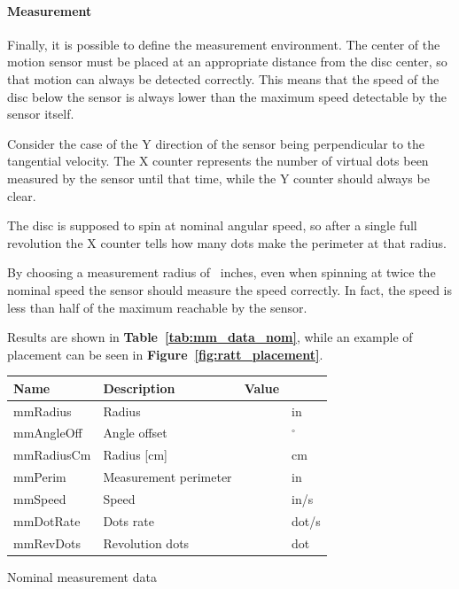 \documentclass[a4paper,10pt]{article}
\makeatletter
\newenvironment{tablehere}{\def\@captype{table}\vspace{2ex}}{\vspace{2ex}}
\newcommand{\citef}[1]{\textbf{Figure~\ref{#1}}}
\newcommand{\citet}[1]{\textbf{Table~\ref{#1}}}
\makeatother
\begin{document}
\begin{multicols}{2}
\paragraph{Measurement}
Finally, it is possible to define the measurement environment. The center of
the motion sensor must be placed at an appropriate distance from the disc
center, so that motion can always be detected correctly. This means that the
speed of the disc below the sensor is always lower than the maximum speed
detectable by the sensor itself.

Consider the case of the Y direction of the sensor being perpendicular to the
tangential velocity. The X counter represents the number of virtual dots been
measured by the sensor until that time, while the Y counter should always be
clear.

The disc is supposed to spin at nominal angular speed, so after a single full
revolution the X counter tells how many dots make the perimeter at that
radius.

By choosing a measurement radius of \mmRadius\  inches, even when spinning at
twice the nominal speed the sensor should measure the speed correctly. In
fact, the speed is less than half of the maximum reachable by the sensor.

Results are shown in \citet{tab:mm_data_nom}, while an example of placement
can be seen in \citef{fig:ratt_placement}.

\begin{tablehere}
\centering \footnotesize
\begin{tabular}{|l|l|rl|}
\hline
\textbf{Name} & \textbf{Description} & \textbf{Value} &	\\
\hline
mmRadius		& Radius				& \mmRadius		& in		\\
mmAngleOff		& Angle offset			& \mmAngleOff	& $^\circ$	\\
\hline
mmRadiusCm		& Radius [cm]			& \mmRadiusCm	& cm		\			& Measurement perimeter	& \mmPerim		& in		\			& Speed					& \mmSpeed		& in/s		\		& Dots rate				& \mmDotRate	& dot/s		\		& Revolution dots		& \mmRevDots	& dot		\\
\hline
\end{tabular}
\caption{Nominal measurement data}
\label{tab:mm_data_nom}
\end{tablehere}


\end{multicols}
\end{document}
